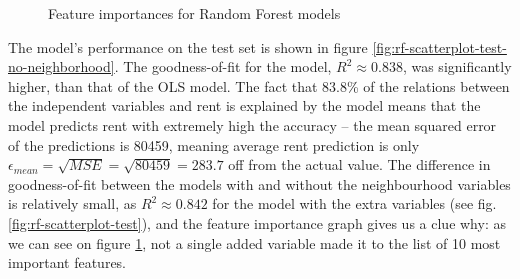 \documentclass[12pt]{report}
\begin{document}
\begin{figure}[ht]
	\caption{Feature importances for Random Forest models}
	\label{fig:rf-importances}
\end{figure}

The model's performance on the test set is shown in figure \ref{fig:rf-scatterplot-test-no-neighborhood}. The goodness-of-fit for the model, $R^2\approx0.838$, was significantly higher, than that of the OLS model. The fact that 83.8\% of the relations between the independent variables and rent is explained by the model means that the model predicts rent with extremely high the accuracy -- the mean squared error of the predictions is 80459, meaning average rent prediction is only $\epsilon_{mean}=\sqrt{MSE}=\sqrt{80459}=283.7$ off from the actual value. The difference in goodness-of-fit between the models with and without the neighbourhood variables is relatively small, as $R^2\approx0.842$ for the model with the extra variables (see fig. \ref{fig:rf-scatterplot-test}), and the feature importance graph gives us a clue why: as we can see on figure \ref{fig:rf-importances}, not a single added variable made it to the list of 10 most important features.
\end{document}
